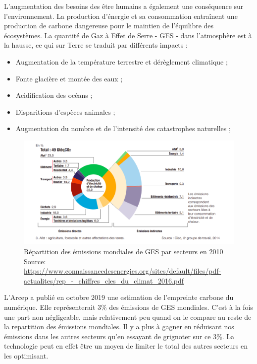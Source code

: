 L'augmentation des besoins des être humains a également une conséquence sur l'environnement.
La production d'énergie et sa consommation entraînent une production de carbone dangereuse pour le maintien de l'équilibre des écosystèmes.
La quantité de Gaz à Effet de Serre - GES - dans l'atmosphère est à la hausse, ce qui sur Terre se traduit par différents impacts :
\begin{itemize}
  \item Augmentation de la température terrestre et dérèglement climatique ;
  \item Fonte glacière et montée des eaux ;
  \item Acidification des océans ;
  \item Disparitions d'espèces animales ;
  \item Augmentation du nombre et de l'intensité des catastrophes naturelles ;
\end{itemize}

\begin{figure}[h]
  \centering
  \includegraphics[scale=0.30]{media/repartition_ges.png}
  \caption{ Répartition des émissions mondiales de GES par secteurs en 2010\newline
      \tiny{Source:
        \url{https://www.connaissancedesenergies.org/sites/default/files/pdf-actualites/rep_-_chiffres_cles_du_climat_2016.pdf}
      }
  }
  \label{fig:terre_rare}
\end{figure}

L'Arcep a publié en octobre 2019 une estimation de l'empreinte carbone du numérique.
Elle représenterait 3\% des émissions de GES mondiales.
C'est à la fois une part non négligeable, mais relativement peu quand on le compare au reste de la repartition des émissions mondiales.
Il y a plus à gagner en réduisant nos émissions dans les autres secteurs qu'en essayant de grignoter sur ce 3\%.
La technologie peut en effet être un moyen de limiter le total des autres secteurs en les optimisant.

